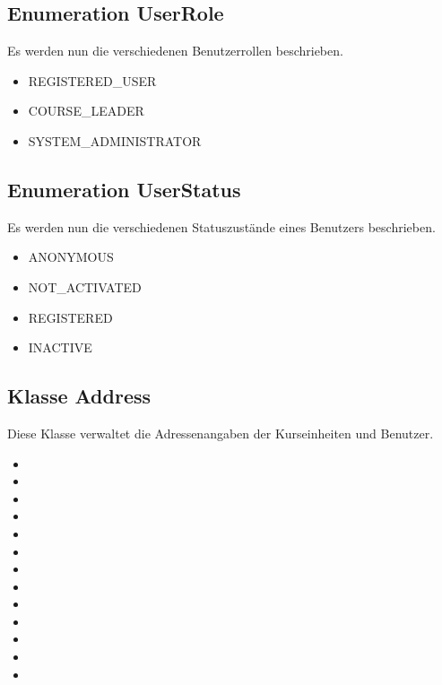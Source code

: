	\subsection{Enumeration UserRole}
	Es werden nun die verschiedenen Benutzerrollen beschrieben.
	\begin{itemize}
		\item {REGISTERED\_USER}
		\item {COURSE\_LEADER}
		\item {SYSTEM\_ADMINISTRATOR}
	\end{itemize}
	
	\subsection{Enumeration UserStatus}
	Es werden nun die verschiedenen Statuszustände eines Benutzers beschrieben.
	\begin{itemize}
		\item {ANONYMOUS}
		\item {NOT\_ACTIVATED}
		\item {REGISTERED}
		\item {INACTIVE}
	\end{itemize}

	
	\subsection{Klasse Address}
	Diese Klasse verwaltet die Adressenangaben der Kurseinheiten und Benutzer.
	\begin{itemize}
		\item {}
		\item {}
		\item {}
		\item {}
		\item {}
		\item {}
		\item {}
		\item {}
		\item {}
		\item {}
		\item {}
		\item {}
		\item {}
		
	\end{itemize}
	
